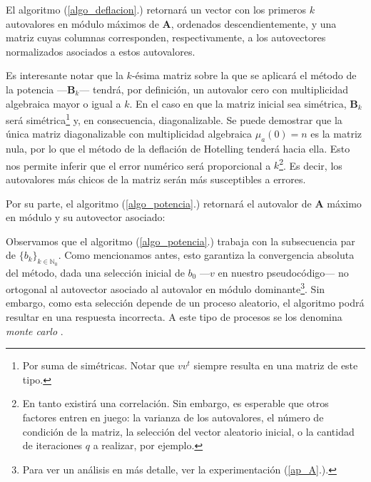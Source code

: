 \vspace{1em}


El algoritmo (\ref{algo_deflacion}.) retornará un vector con los primeros $k$ autovalores en módulo máximos de \textbf{A}, ordenados descendientemente, y una matriz cuyas columnas corresponden, respectivamente, a los autovectores normalizados asociados a estos autovalores. 

\vspace{1em}
Es interesante notar que la $k$-ésima matriz sobre la que se aplicará el método de la potencia ---\textbf{B}$_k$--- tendrá, por definición, un autovalor cero con multiplicidad algebraica mayor o igual a $k$. En el caso en que la matriz inicial sea simétrica, \textbf{B}$_k$ será simétrica\footnote{Por suma de simétricas. Notar que $v v^t$ siempre resulta en una matriz de este tipo.} y, en consecuencia, diagonalizable. Se puede demostrar que la única matriz diagonalizable con multiplicidad algebraica $\mu_{a}(0) = n$ es la matriz nula, por lo que el método de la deflación de Hotelling tenderá hacia ella. Esto nos permite inferir que el error numérico será proporcional a $k$\footnote{En tanto existirá una correlación. Sin embargo, es esperable que otros factores entren en juego: la varianza de los autovalores, el número de condición de la matriz, la selección del vector aleatorio inicial, o la cantidad de iteraciones $q$ a realizar, por ejemplo.}. Es decir, los autovalores más chicos de la matriz serán más susceptibles a errores.  


\vspace{2em}
\noindent Por su parte, el algoritmo (\ref{algo_potencia}.) retornará el autovalor de \textbf{A} máximo en módulo y su autovector asociado:

\vspace{1em}


\vspace{1em}
Observamos que el algoritmo (\ref{algo_potencia}.) trabaja con la subsecuencia par de $\{b_k\}_{k \in \mathbb{N}_0}$. Como mencionamos antes, esto garantiza la convergencia absoluta del método, dada una selección inicial de $b_0$ ---$v$ en nuestro pseudocódigo--- no ortogonal al autovector asociado al autovalor en módulo dominante\footnote{Para ver un análisis en más detalle, ver la experimentación (\ref{ap_A}.).}. Sin embargo, como esta selección depende de un proceso aleatorio, el algoritmo podrá resultar en una respuesta incorrecta. A este tipo de procesos se los denomina \textit{monte carlo} \cite{Brassard}. 

